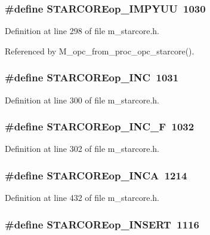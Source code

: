 \subsubsection{\setlength{\rightskip}{0pt plus 5cm}\#define STARCOREop\_\-IMPYUU~1030}\label{m__starcore_8h_0bb7ac4daa77fdeb5f3f4c3a37ed4328}




Definition at line 298 of file m\_\-starcore.h.

Referenced by M\_\-opc\_\-from\_\-proc\_\-opc\_\-starcore().
\subsubsection{\setlength{\rightskip}{0pt plus 5cm}\#define STARCOREop\_\-INC~1031}\label{m__starcore_8h_e9aa74e30fda950f4477c2b99e53f71c}




Definition at line 300 of file m\_\-starcore.h.
\subsubsection{\setlength{\rightskip}{0pt plus 5cm}\#define STARCOREop\_\-INC\_\-F~1032}\label{m__starcore_8h_955c8b751ffc81f28e731abe75dc358c}




Definition at line 302 of file m\_\-starcore.h.
\subsubsection{\setlength{\rightskip}{0pt plus 5cm}\#define STARCOREop\_\-INCA~1214}\label{m__starcore_8h_c62b76109c0bad32761cce39bbd30f60}




Definition at line 432 of file m\_\-starcore.h.
\subsubsection{\setlength{\rightskip}{0pt plus 5cm}\#define STARCOREop\_\-INSERT~1116}\label{m__starcore_8h_4b674c774afde763ae705c589fbc9000}




